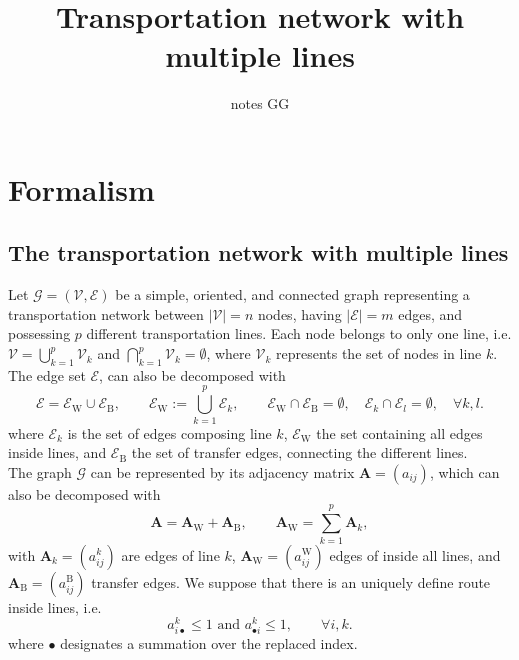 \documentclass[11p]{article}
\title{Transportation network with multiple lines}
\author{notes GG}
\begin{document}
\maketitle

\section{Formalism}

\subsection{The transportation network with multiple lines}

Let $\mathcal{G} = (\mathcal{V}, \mathcal{E})$ be a simple, oriented, and connected graph representing a transportation network between $|\mathcal{V}| = n$ nodes, having $|\mathcal{E}| = m$ edges, and possessing $p$ different transportation lines. Each node belongs to only one line, i.e. $\mathcal{V} = \bigcup_{k=1}^p \mathcal{V}_k$ and $\bigcap_{k=1}^p \mathcal{V}_k = \emptyset$, where $\mathcal{V}_k$ represents the set of nodes in line $k$. The edge set $\mathcal{E}$, can also be decomposed with
\begin{equation}
\mathcal{E} = \mathcal{E}_\text{W} \cup \mathcal{E}_\text{B}, \qquad \mathcal{E}_\text{W} := \bigcup_{k=1}^p \mathcal{E}_k, \qquad \mathcal{E}_\text{W} \cap \mathcal{E}_\text{B} = \emptyset, \quad \mathcal{E}_k \cap \mathcal{E}_l = \emptyset, \quad \forall k, l.
\end{equation}
where $\mathcal{E}_k$ is the set of edges composing line $k$, $\mathcal{E}_\text{W}$ the set containing all edges inside lines, and $\mathcal{E}_\text{B}$ the set of transfer edges, connecting the different lines. \\
The graph $\mathcal{G}$ can be represented by its adjacency matrix $\mathbf{A} = (a_{ij})$, which can also be decomposed with 
\begin{equation}
\mathbf{A} = \mathbf{A}_\text{W} + \mathbf{A}_\text{B}, \qquad \mathbf{A}_\text{W} = \sum_{k=1}^p \mathbf{A}_k,
\end{equation}
with $\mathbf{A}_k = (a^k_{ij})$ are edges of line $k$, $\mathbf{A}_\text{W} = (a^\text{W}_{ij})$ edges of inside all lines, and $\mathbf{A}_\text{B} = (a^\text{B}_{ij})$ transfer edges. We suppose that there is an uniquely define route inside lines, i.e. 
\begin{equation}
a^k_{i \bullet} \leq 1 \text{ and } a^k_{\bullet i} \leq 1, \qquad \forall i,k.
\end{equation}
where $\bullet$ designates a summation over the replaced index.
\end{document}

